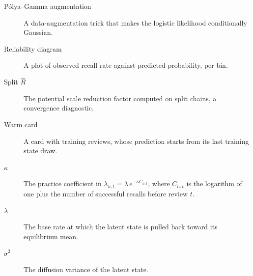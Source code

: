 \begin{description}
  \item[P\'olya--Gamma augmentation] A data-augmentation trick that makes the logistic likelihood conditionally Gaussian.
  \item[Reliability diagram] A plot of observed recall rate against predicted probability, per bin.
  \item[Split $\hat R$] The potential scale reduction factor computed on split chains, a convergence diagnostic.
  \item[Warm card] A card with training reviews, whose prediction starts from its last training state draw.
  \item[$\kappa$] The practice coefficient in $\lambda_{n,t} = \lambda\,e^{-\kappa C_{n,t}}$, where $C_{n,t}$ is the logarithm of one plus the number of successful recalls before review $t$.
  \item[$\lambda$] The base rate at which the latent state is pulled back toward its equilibrium mean.
  \item[$\sigma^2$] The diffusion variance of the latent state.
\end{description}
